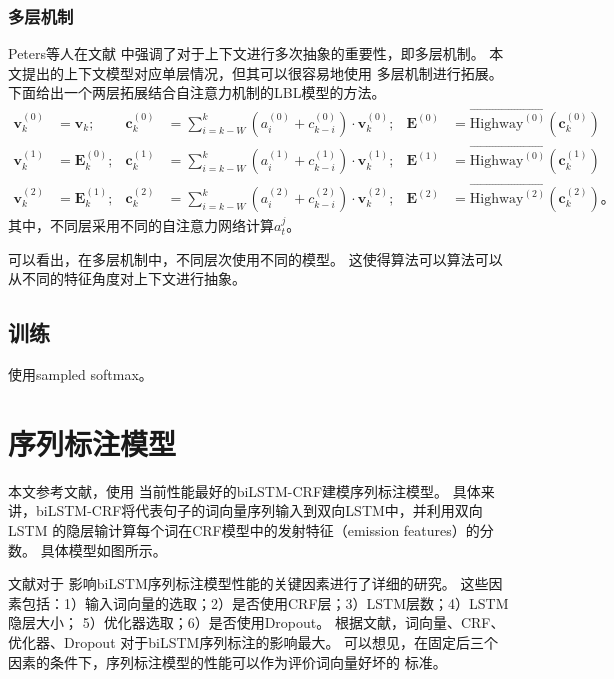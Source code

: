 \subsubsection{多层机制}
Peters等人在文献
中强调了对于上下文进行多次抽象的重要性，即多层机制。
本文提出的上下文模型对应单层情况，但其可以很容易地使用
多层机制进行拓展。
下面给出一个两层拓展结合自注意力机制的LBL模型的方法。
\begin{align*}
\mathbf{v}_k^{(0)} &= \mathbf{v}_k; &
 \mathbf{c}^{(0)}_k & = \sum_{i=k-W}^k (a_i^{(0)} + c_{k-i}^{(0)}) \cdot \mathbf{v}_k^{(0)}; &
 \mathbf{E}^{(0)} &= \overrightarrow{\text{Highway}^{(0)}}(\mathbf{c}^{(0)}_k)\\
\mathbf{v}_k^{(1)} & = \mathbf{E}_k^{(0)}; &
 \mathbf{c}^{(1)}_k & = \sum_{i=k-W}^k (a_i^{(1)} + c_{k-i}^{(1)}) \cdot \mathbf{v}_k^{(1)}; &
 \mathbf{E}^{(1)}  &= \overrightarrow{\text{Highway}^{(0)}}(\mathbf{c}^{(1)}_k)\\
\mathbf{v}_k^{(2)} & = \mathbf{E}_k^{(1)}; &
 \mathbf{c}^{(2)}_k & = \sum_{i=k-W}^k (a_i^{(2)} + c_{k-i}^{(2)}) \cdot \mathbf{v}_k^{(2)}; &
\mathbf{E}^{(2)}  &= \overrightarrow{\text{Highway}^{(2)}}(\mathbf{c}^{(2)}_k)\text{。}
\end{align*}
其中，不同层采用不同的自注意力网络计算$a_t^{j}$。

可以看出，在多层机制中，不同层次使用不同的模型。
这使得算法可以算法可以从不同的特征角度对上下文进行抽象。

\subsection{训练}

使用sampled softmax。

\section{序列标注模型}

本文参考文献，使用
当前性能最好的biLSTM-CRF建模序列标注模型。
具体来讲，biLSTM-CRF将代表句子的词向量序列输入到双向LSTM中，并利用双向LSTM
的隐层输计算每个词在CRF模型中的发射特征（emission features）的分数。
具体模型如图所示。

文献对于
影响biLSTM序列标注模型性能的关键因素进行了详细的研究。
这些因素包括：1）输入词向量的选取；2）是否使用CRF层；3）LSTM层数；4）LSTM隐层大小；
5）优化器选取；6）是否使用Dropout。
根据文献，词向量、CRF、优化器、Dropout
对于biLSTM序列标注的影响最大。
可以想见，在固定后三个因素的条件下，序列标注模型的性能可以作为评价词向量好坏的
标准。

